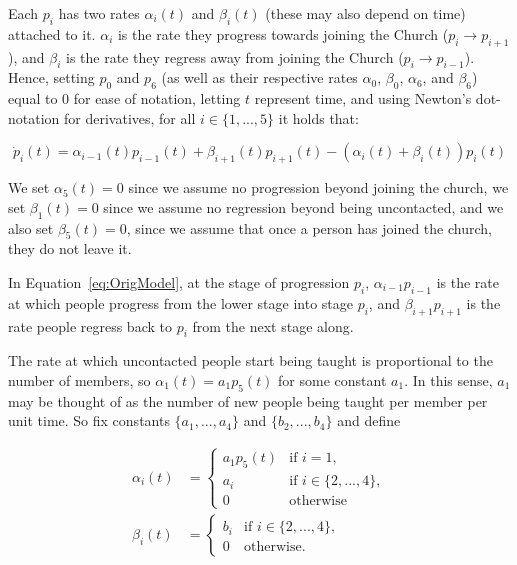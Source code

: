 \documentclass[11pt]{amsart}
\begin{document}
Each $p_i$ has two rates $\alpha_i(t)$ and $\beta_i(t)$ (these may also depend on time) attached to it. $\alpha_i$ is the rate they progress towards joining the Church ($p_i \rightarrow p_{i+1}$), and $\beta_i$ is the rate they regress away from joining the Church ($p_i \rightarrow p_{i-1}$). Hence, setting $p_0$ and $p_6$ (as well as their respective rates $\alpha_0$, $\beta_0$, $\alpha_6$, and $\beta_6$) equal to 0 for ease of notation, letting $t$ represent time, and using Newton's dot-notation for derivatives, for all $i \in \{1, ..., 5\}$ it holds that:

\begin{equation}
\dot{p}_i(t) = \alpha_{i-1}(t) p_{i-1}(t) + \beta_{i+1}(t) p_{i+1}(t) - (\alpha_i(t) + \beta_i(t)) p_i(t)
\label{eq:OrigModel}
\end{equation}

We set $\alpha_5(t) = 0$ since we assume no progression beyond joining the church, we set $\beta_1(t) = 0$ since we assume no regression beyond being uncontacted, and we also set $\beta_5(t) = 0$, since we assume that once a person has joined the church, they do not leave it.

In Equation~\ref{eq:OrigModel}, at the stage of progression $p_i$, $\alpha_{i-1} p_{i-1}$ is the rate at which people progress from the lower stage into stage $p_i$, and $\beta_{i+1} p_{i+1}$ is the rate people regress back to $p_i$ from the next stage along.

The rate at which uncontacted people start being taught is proportional to the number of members, so $\alpha_1(t) = a_1 p_5(t)$ for some constant $a_1$. In this sense, $a_1$ may be thought of as the number of new people being taught per member per unit time. So fix constants $\{a_1, ..., a_4\}$ and $\{b_2, ..., b_4\}$ and define

\begin{equation}
\begin{aligned}
    \alpha_i(t) &= \begin{cases} 
    a_1 p_5(t) & \text{if } i = 1, \\
    a_i & \text{if } i \in \{2, ..., 4\}, \\
    0 & \text{otherwise}
    \end{cases} \\
    \beta_i(t) &= \begin{cases} 
    b_i & \text{if } i \in \{2, ..., 4\}, \\
    0 & \text{otherwise}.
    \end{cases}
\end{aligned}
\label{eq:Rates}
\end{equation}
\end{document}
